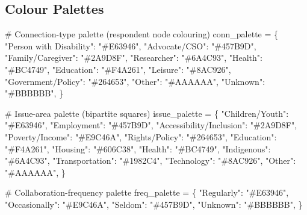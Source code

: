 \documentclass[
  letterpaper,
  DIV=11,
  numbers=noendperiod]{scrartcl}
\newenvironment{Shaded}{\begin{snugshade}}{\end{snugshade}}
\newcommand{\CommentTok}[1]{\textcolor[rgb]{0.37,0.37,0.37}{#1}}
\newcommand{\NormalTok}[1]{\textcolor[rgb]{0.00,0.23,0.31}{#1}}
\newcommand{\OperatorTok}[1]{\textcolor[rgb]{0.37,0.37,0.37}{#1}}
\newcommand{\StringTok}[1]{\textcolor[rgb]{0.13,0.47,0.30}{#1}}
\begin{document}
\subsection{Colour Palettes}\label{colour-palettes}

\label{palettes}
\begin{Shaded}
\begin{Highlighting}[]
\CommentTok{\# Connection{-}type palette (respondent node colouring)}
\NormalTok{conn\_palette }\OperatorTok{=}\NormalTok{ \{}
    \StringTok{"Person with Disability"}\NormalTok{: }\StringTok{"\#E63946"}\NormalTok{,}
    \StringTok{"Advocate/CSO"}\NormalTok{:           }\StringTok{"\#457B9D"}\NormalTok{,}
    \StringTok{"Family/Caregiver"}\NormalTok{:       }\StringTok{"\#2A9D8F"}\NormalTok{,}
    \StringTok{"Researcher"}\NormalTok{:             }\StringTok{"\#6A4C93"}\NormalTok{,}
    \StringTok{"Health"}\NormalTok{:                 }\StringTok{"\#BC4749"}\NormalTok{,}
    \StringTok{"Education"}\NormalTok{:              }\StringTok{"\#F4A261"}\NormalTok{,}
    \StringTok{"Leisure"}\NormalTok{:                }\StringTok{"\#8AC926"}\NormalTok{,}
    \StringTok{"Government/Policy"}\NormalTok{:      }\StringTok{"\#264653"}\NormalTok{,}
    \StringTok{"Other"}\NormalTok{:                  }\StringTok{"\#AAAAAA"}\NormalTok{,}
    \StringTok{"Unknown"}\NormalTok{:                }\StringTok{"\#BBBBBB"}\NormalTok{,}
\NormalTok{\}}

\CommentTok{\# Issue{-}area palette (bipartite squares)}
\NormalTok{issue\_palette }\OperatorTok{=}\NormalTok{ \{}
    \StringTok{"Children/Youth"}\NormalTok{:          }\StringTok{"\#E63946"}\NormalTok{,}
    \StringTok{"Employment"}\NormalTok{:              }\StringTok{"\#457B9D"}\NormalTok{,}
    \StringTok{"Accessibility/Inclusion"}\NormalTok{: }\StringTok{"\#2A9D8F"}\NormalTok{,}
    \StringTok{"Poverty/Income"}\NormalTok{:          }\StringTok{"\#E9C46A"}\NormalTok{,}
    \StringTok{"Rights/Policy"}\NormalTok{:           }\StringTok{"\#264653"}\NormalTok{,}
    \StringTok{"Education"}\NormalTok{:               }\StringTok{"\#F4A261"}\NormalTok{,}
    \StringTok{"Housing"}\NormalTok{:                 }\StringTok{"\#606C38"}\NormalTok{,}
    \StringTok{"Health"}\NormalTok{:                  }\StringTok{"\#BC4749"}\NormalTok{,}
    \StringTok{"Indigenous"}\NormalTok{:              }\StringTok{"\#6A4C93"}\NormalTok{,}
    \StringTok{"Transportation"}\NormalTok{:          }\StringTok{"\#1982C4"}\NormalTok{,}
    \StringTok{"Technology"}\NormalTok{:              }\StringTok{"\#8AC926"}\NormalTok{,}
    \StringTok{"Other"}\NormalTok{:                   }\StringTok{"\#AAAAAA"}\NormalTok{,}
\NormalTok{\}}

\CommentTok{\# Collaboration{-}frequency palette}
\NormalTok{freq\_palette }\OperatorTok{=}\NormalTok{ \{}
    \StringTok{"Regularly"}\NormalTok{:    }\StringTok{"\#E63946"}\NormalTok{,}
    \StringTok{"Occasionally"}\NormalTok{: }\StringTok{"\#E9C46A"}\NormalTok{,}
    \StringTok{"Seldom"}\NormalTok{:       }\StringTok{"\#457B9D"}\NormalTok{,}
    \StringTok{"Unknown"}\NormalTok{:      }\StringTok{"\#BBBBBB"}\NormalTok{,}
\NormalTok{\}}
\end{Highlighting}
\end{Shaded}
\end{document}
